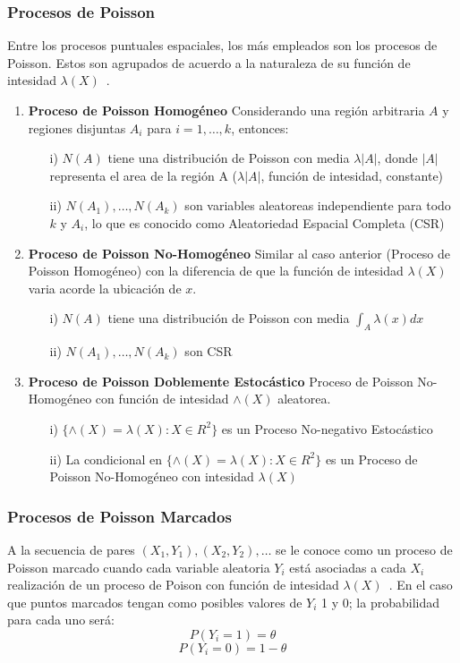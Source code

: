 \subsubsection{Procesos de Poisson}
Entre los procesos puntuales espaciales, los más empleados son los procesos de Poisson. Estos son agrupados de acuerdo a la naturaleza de su función de intesidad $\lambda(X)$~\cite{baddeley2015spatial}.
\begin{enumerate}
    \item \textbf{Proceso de Poisson Homogéneo}
    Considerando una región arbitraria $A$ y regiones disjuntas $A_i$ para $i=1,\dots,k$, entonces:
    \begin{itemize}
        \item [i)] $N(A)$ tiene una distribución de Poisson con media $\lambda |A|$, donde $|A|$ representa el area de la región A ($\lambda |A|$, función de intesidad, constante)
        \item [ii)] $N(A_1), \dots, N(A_k)$ son variables aleatoreas independiente para todo $k$ y $A_i$, lo que es conocido como Aleatoriedad Espacial Completa (CSR)
    \end{itemize}
    \item \textbf{Proceso de Poisson No-Homogéneo}
    Similar al caso anterior (Proceso de Poisson Homogéneo) con la diferencia de que la función de intesidad $\lambda(X)$ varia acorde la ubicación de $x$.
    \begin{itemize}
        \item [i)] $N(A)$ tiene una distribución de Poisson con media $\int_A \lambda(x)dx$
        \item [ii)] $N(A_1), \dots, N(A_k)$ son CSR
    \end{itemize}
    \item \textbf{Proceso de Poisson Doblemente Estocástico}
    Proceso de Poisson No-Homogéneo con función de intesidad $\wedge(X)$ aleatorea.
    \begin{itemize}
        \item [i)] $\{\wedge (X)= \lambda(X): X \in R^2\}$ es un Proceso No-negativo Estocástico
        \item [ii)] La condicional en $\{\wedge (X)= \lambda(X) : X \in R^2\}$ es un Proceso de Poisson No-Homogéneo con intesidad $\lambda(X)$
    \end{itemize}
\end{enumerate}

\subsubsection{Procesos de Poisson Marcados}
A la secuencia de pares $(X_1,Y_1), (X_2,Y_2), \dots$ se le conoce como un proceso de Poisson marcado cuando cada variable aleatoria $Y_i$ está asociadas a cada $X_i$ realización de un proceso de Poison con función de intesidad $\lambda(X)$~\cite{pinsky2010introduction}. En el caso que puntos marcados tengan como posibles valores de $Y_i$ 1 y 0; la probabilidad para cada uno será:
\begin{equation*}
    P(Y_i = 1) = \theta
\end{equation*}
\begin{equation*}
    P(Y_i = 0) = 1 - \theta
\end{equation*}
